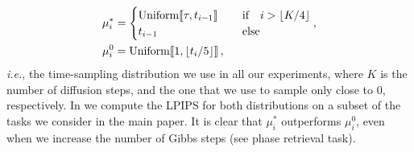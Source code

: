 \begin{align}
    \label{eq:sampling-dist-mix}
  & \mu^* _{i} = \begin{cases} \mbox{Uniform}\llbracket \tau, t_{i-1} \rrbracket \, & \quad \text{if} \quad i > \lfloor  K / 4 \rfloor \\
                    t_{i-1} \, & \quad \text{else} 
\end{cases},\\
\label{eq:sampling-dist-zero}
& \mu^0 _i = \mbox{Uniform}\llbracket 1, \lfloor t_i / 5 \rfloor \rrbracket \,, 
\end{align}
\emph{i.e.}, the time-sampling distribution we use in all our experiments, where $K$ is the number of diffusion steps, and the one that we use to sample only close to $0$, respectively. In  we compute the LPIPS for both distributions on a subset of the tasks we consider in the main paper. It is clear that $\mu^* _i$ outperforms $\mu^0 _i$, even when we increase the number of Gibbs steps (see phase retrieval task). 




